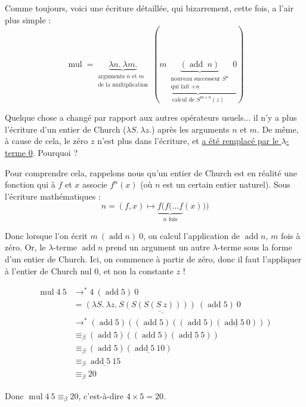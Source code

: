 \documentclass[11pt]{article}
\begin{document}
Comme toujours, voici une écriture détaillée, qui bizarrement, cette fois, a l'air plus simple :
$$\operatorname{mul} = \underbrace{\lambda n.~\lambda m.}_{\substack{\text{arguments $n$ et $m$} \\ \text{de la multiplication}}}~\left(\underbrace{m~\underbrace{(\operatorname{add}~n)}_{\substack{\text{nouveau successeur $S^n$}\\\text{qui fait $+n$}}}~0}_\text{calcul de $S^{m\times n}(z)$}\right)$$

Quelque chose a changé par rapport aux autres opérateurs usuels... il n'y a plus l'écriture d'un entier de Church ($\lambda S.~\lambda z.$) après les arguments $n$ et $m$. De même, à cause de cela, le zéro $z$ n'est plus dans l'écriture, et \underline{a été remplacé par le $\lambda$-terme 0}. Pourquoi ?

Pour comprendre cela, rappelons nous qu'un entier de Church est en réalité une fonction qui à $f$ et $x$ associe $f^{n}(x)$ (où $n$ est un certain entier naturel). Sous l'écriture mathématiques :
$$\boxed{n} = (f, x) \mapsto \underbrace{f(f(\dots f}_\text{$n$ fois}(x)))$$

Donc lorsque l'on écrit $m~(\operatorname{add} n)~0$, on calcul l'application de $\operatorname{add}n$, $m$ fois à zéro. Or, le $\lambda$-terme $\operatorname{add}n$ prend un argument un autre $\lambda$-terme sous la forme d'un entier de Church. Ici, on commence à partir de zéro, donc il faut l'appliquer à l'entier de Church nul 0, et non la constante $z$ !

\newpage
\begin{example}
    \begin{equation*}
    \begin{aligned}
        \operatorname{mul}4~5&\longrightarrow^* 4~(\operatorname{add}5)~0\\
        &= \underline{\underline{\left(\lambda S.~\lambda z.~ S(S(S(S~z)))\right)~(\operatorname{add}5)}~0}\\
        &\longrightarrow^* (\operatorname{add}5)((\operatorname{add}5)((\operatorname{add}5)(\underline{\operatorname{add}5~0})))\\
        &\equiv_\beta (\operatorname{add}5)((\operatorname{add}5)(\underline{\operatorname{add}5~5}))\\
        &\equiv_\beta (\operatorname{add}5)(\underline{\operatorname{add}5~10})\\
        &\equiv_\beta \underline{\operatorname{add}5~15}\\
        &\equiv_\beta 20
    \end{aligned}
    \end{equation*}

    Donc $\operatorname{mul}4~5 \equiv_\beta 20$, c'est-à-dire $4\times5=20$.
\end{example}
\end{document}
